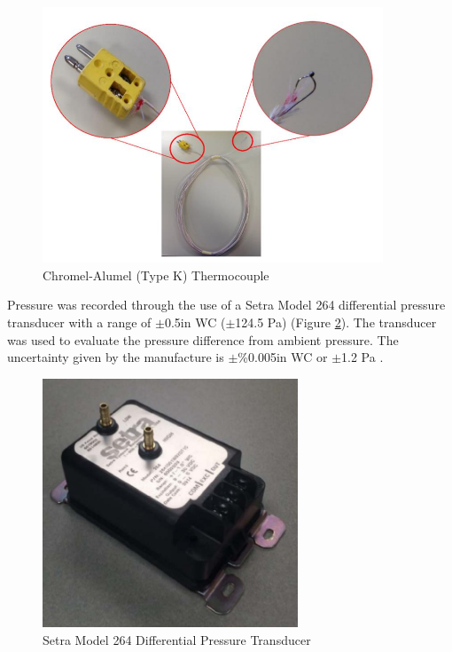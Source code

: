 \documentclass{article}
\begin{document}
\begin{figure} [H]
	\centering
	\includegraphics[width = 4in]{0_Images/Instrumentation/Thermocouple.jpg}
	\caption{Chromel-Alumel (Type K) Thermocouple}
	\label{fig:Thermocouple}
\end{figure}

Pressure was recorded through the use of a Setra Model 264 differential pressure transducer with a range of $\pm$0.5in WC ($\pm$124.5 Pa) (Figure \ref{fig:Setra}). The transducer was used to evaluate the pressure difference from ambient pressure. The uncertainty given by the manufacture is $\pm$\%0.005in WC or $\pm$1.2 Pa \cite{SetraManual}.

\begin{figure} [H]
	\centering
	\includegraphics[width = 3in]{0_Images/Instrumentation/Setra.jpg}
	\caption{Setra Model 264 Differential Pressure Transducer}
	\label{fig:Setra}
\end{figure}
\end{document}
